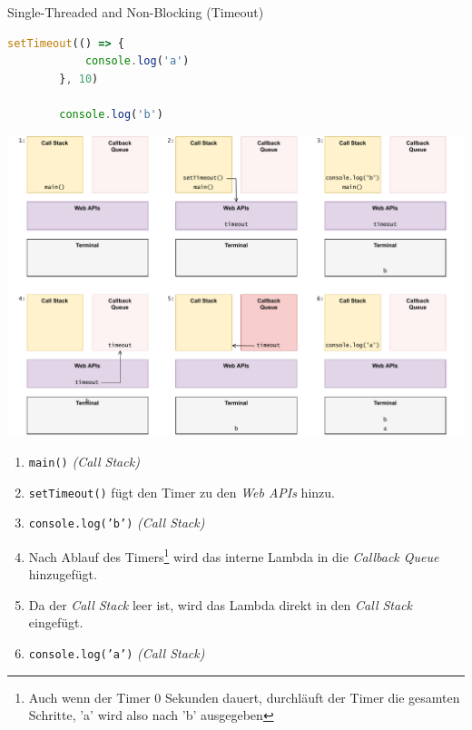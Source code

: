 \begin{example}{Single-Threaded and Non-Blocking (Timeout)}
    \begin{lstlisting}[language=JavaScript]
        setTimeout(() => {
            console.log('a')
        }, 10)

        console.log('b')
    \end{lstlisting}

    \includegraphics[width=\textwidth]{includes/figures/example_stanb_2.pdf}

    \begin{enumerate}
        \item \texttt{main()} \emph{(Call Stack)}
        \item \texttt{setTimeout()} fügt den Timer zu den \emph{Web APIs} hinzu.
        \item \texttt{console.log('b')} \emph{(Call Stack)}
        \item Nach Ablauf des Timers\footnote{Auch wenn der Timer 0 Sekunden dauert, durchläuft der Timer die gesamten Schritte, 'a' wird also nach 'b' ausgegeben} wird das interne Lambda in die \emph{Callback Queue} hinzugefügt.
        \item Da der \emph{Call Stack} leer ist, wird das Lambda direkt in den \emph{Call Stack} eingefügt.
        \item \texttt{console.log('a')} \emph{(Call Stack)}
    \end{enumerate}
\end{example}

